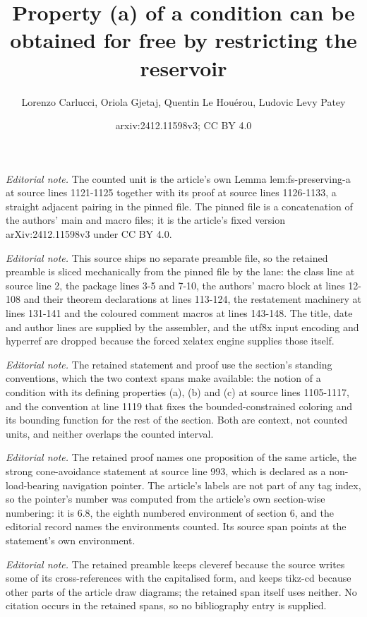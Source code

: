 \documentclass{article}
\title{Property (a) of a condition can be obtained for free by restricting the reservoir}
\author{Lorenzo Carlucci, Oriola Gjetaj, Quentin Le Houérou, Ludovic Levy Patey}
\date{arxiv:2412.11598v3; CC BY 4.0}
\numberwithin{theorem}{section}
\begin{document}
\maketitle
\noindent\textit{Editorial note.} The counted unit is the article's own Lemma lem:fs-preserving-a at source lines 1121-1125 together with its proof at source lines 1126-1133, a straight adjacent pairing in the pinned file. The pinned file is a concatenation of the authors' main and macro files; it is the article's fixed version arXiv:2412.11598v3 under CC BY 4.0.\par\medskip
\noindent\textit{Editorial note.} This source ships no separate preamble file, so the retained preamble is sliced mechanically from the pinned file by the lane: the class line at source line 2, the package lines 3-5 and 7-10, the authors' macro block at lines 12-108 and their theorem declarations at lines 113-124, the restatement machinery at lines 131-141 and the coloured comment macros at lines 143-148. The title, date and author lines are supplied by the assembler, and the utf8x input encoding and hyperref are dropped because the forced xelatex engine supplies those itself.\par\medskip
\noindent\textit{Editorial note.} The retained statement and proof use the section's standing conventions, which the two context spans make available: the notion of a condition with its defining properties (a), (b) and (c) at source lines 1105-1117, and the convention at line 1119 that fixes the bounded-constrained coloring and its bounding function for the rest of the section. Both are context, not counted units, and neither overlaps the counted interval.\par\medskip
\noindent\textit{Editorial note.} The retained proof names one proposition of the same article, the strong cone-avoidance statement at source line 993, which is declared as a non-load-bearing navigation pointer. The article's labels are not part of any tag index, so the pointer's number was computed from the article's own section-wise numbering: it is 6.8, the eighth numbered environment of section 6, and the editorial record names the environments counted. Its source span points at the statement's own environment.\par\medskip
\noindent\textit{Editorial note.} The retained preamble keeps cleveref because the source writes some of its cross-references with the capitalised form, and keeps tikz-cd because other parts of the article draw diagrams; the retained span itself uses neither. No citation occurs in the retained spans, so no bibliography entry is supplied.\par\medskip
\end{document}
